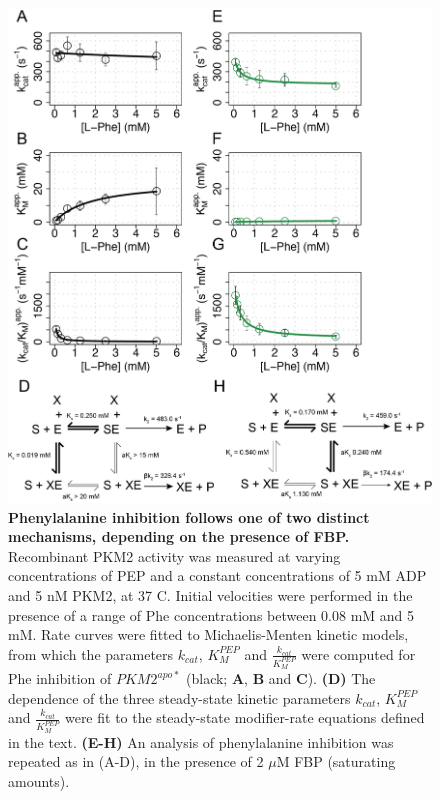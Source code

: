 \begin{figure}[!ht]
\includegraphics[scale=0.7]{ch4_fig6_phe_fbp_activity.png}
\caption[Phenylalanine inhibition follows one of two distinct mechanisms, depending on the presence of FBP.] {\textbf{Phenylalanine inhibition follows one of two distinct mechanisms, depending on the presence of FBP.} Recombinant PKM2 activity was measured at varying concentrations of PEP and a constant concentrations of 5 mM ADP and 5 nM PKM2, at 37 \textdegree C. Initial velocities were performed in the presence of a range of Phe concentrations between 0.08 mM and 5 mM. Rate curves were fitted to Michaelis-Menten kinetic models, from which the parameters $k_{cat}$, $K_{M}^{PEP}$ and $\frac{k_{cat}}{K_{M}^{PEP}}$ were computed for Phe inhibition of $PKM2^{apo \ast}$ (black; \textbf{A}, \textbf{B} and \textbf{C}). \textbf{(D)} The dependence of the three steady-state kinetic parameters $k_{cat}$, $K_{M}^{PEP}$ and $\frac{k_{cat}}{K_{M}^{PEP}}$ were fit to the steady-state modifier-rate equations defined in the text. \textbf{(E-H)} An analysis of phenylalanine inhibition was repeated as in (A-D), in the presence of 2 $\mu$M FBP (saturating amounts). }
\label{fig:phe_mechanism}
\end{figure}

